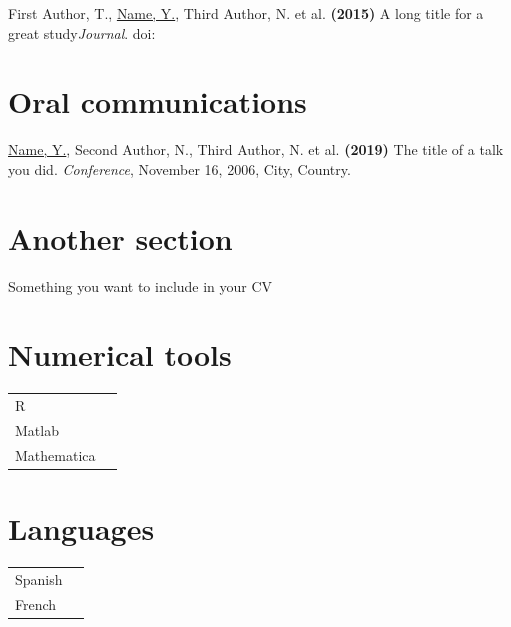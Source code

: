 \documentclass[a4paper,10pt]{article}
\begin{document}
\begin{adjustbox}{valign=t}
\begin{minipage}{0.6\textwidth}
\begin{description}
	\item First Author, T., \underline{Name, Y.}, Third Author, N. et al. \textbf{(2015)} A long title for a great study{\it Journal}. doi:~
	
\end{description}
\section*{Oral communications}
\begin{description}
	\raggedright
	\item \underline{Name, Y.}, Second Author, N., Third Author, N. et al. \textbf{(2019)} The title of a talk you did. {\it Conference}, November 16, 2006, City, Country.
\end{description}
\section*{Another section}
\begin{description}
	\raggedright
	\item Something you want to include in your CV
\end{description}

\MySkip
\begin{multicols}{2}
\section*{Numerical tools}
\begin{tabular}{ll}
	R  			& \SkillBull{$\bullet \bullet \bullet \, \circ$}\\
	Matlab 		& \SkillBull{$\bullet \bullet \bullet \, \circ$}\\
	Mathematica 	& \SkillBull{$\bullet \circ \circ \, \circ$}\\
\end{tabular}

\vfill\null \columnbreak  %

\section*{Languages}
\begin{tabular}{ll}
	Spanish 		& \SkillBull{$\bullet \bullet \bullet \, \circ$}\\
	French 		& \SkillBull{$\bullet \circ \circ \, \circ$}\\
\end{tabular}
\end{multicols}
\LastUpdate
\end{minipage}
\end{adjustbox}
\end{document}
